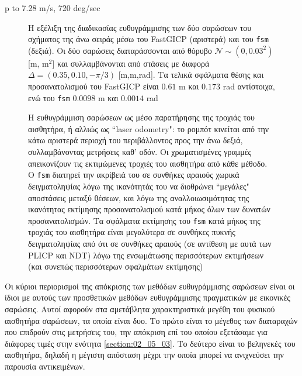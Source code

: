 p to 7.28 m/s, 720 deg/sec

\begin{figure}[]\centering
  
  \vspace{0.5cm}
  \caption{\small Η εξέλιξη της διαδικασίας ευθυγράμμισης των δύο σαρώσεων του
           σχήματος της άνω σειράς μέσω του FastGICP (αριστερά) και του
           \texttt{fsm} (δεξιά). Οι δύο σαρώσεις διαταράσσονται από θόρυβο
           $\mathcal{N} \sim (0, 0.03^2)$ [m, m$^2$] και συλλαμβάνονται από
           στάσεις με διαφορά $\Delta = (0.35, 0.10, -\pi/3)$ [m,m,rad].
           Τα τελικά σφάλματα θέσης και προσανατολισμού του FastGICP είναι
           $0.61$ m και $0.173$ rad αντίστοιχα, ενώ του \texttt{fsm}
           $0.0098$ m και $0.0014$ rad}
  \label{fig:02_05_04:02}
\end{figure}

\begin{figure}[]\centering
  
  \vspace{-2cm}
  \caption{\small Η ευθυγράμμιση σαρώσεων ως μέσο παρατήρησης της τροχιάς του
           αισθητήρα, ή αλλιώς ως ``laser odometry": το ρομπότ κινείται από
           την κάτω αριστερά περιοχή του περιβάλλοντος προς την άνω δεξιά,
           συλλαμβάνοντας μετρήσεις καθ' οδόν. Οι χρωματισμένες γραμμές
           απεικονίζουν τις εκτιμώμενες τροχιές του αισθητήρα από κάθε μέθοδο.
           Ο \texttt{fsm} διατηρεί την ακρίβειά του σε συνθήκες αραιούς χωρικά
           δειγματοληψίας λόγω της ικανότητάς του να διοθρώνει ``μεγάλες"
           αποστάσεις μεταξύ θέσεων, και λόγω της αναλλοιωσιμότητας της
           ικανότητας εκτίμησης προσανατολισμού κατά μήκος όλων των δυνατών
           προσανατολισμών. Τα σφάλματα εκτίμησης του \texttt{fsm} κατά μήκος
           της τροχιάς του αισθητήρα είναι μεγαλύτερα σε συνθήκες πυκνής
           δειγματοληψίας από ότι σε συνθήκες αραιούς (σε αντίθεση με αυτά των
           PLICP και NDT) λόγω της ενσωμάτωσης περισσότερων εκτιμήσεων (και
           συνεπώς περισσότερων σφαλμάτων εκτίμησης)}
  \label{fig:02_05_04:01}
\end{figure}


Οι κύριοι περιορισμοί της απόκρισης των μεθόδων ευθυγράμμισης σαρώσεων είναι οι
ίδιοι με αυτούς των προσθετικών μεθόδων ευθυγράμμισης πραγματικών με εικονικές
σαρώσεις. Αυτοί αφορούν στα αμετάβλητα χαρακτηριστικά μεγέθη του φυσικού
αισθητήρα σαρώσεων, τα οποία είναι δυο. Το πρώτο είναι το μέγεθος των
διαταραχών που επιδρούν στις μετρήσεις του, την απόκριση επί του οποίου
εξετάσαμε για διάφορες τιμές στην ενότητα \ref{section:02_05_03}. Το δεύτερο
είναι το βεληνεκές του αισθητήρα, δηλαδή η μέγιστη απόσταση μέχρι την οποία
μπορεί να ανιχνεύσει την παρουσία αντικειμένων.

